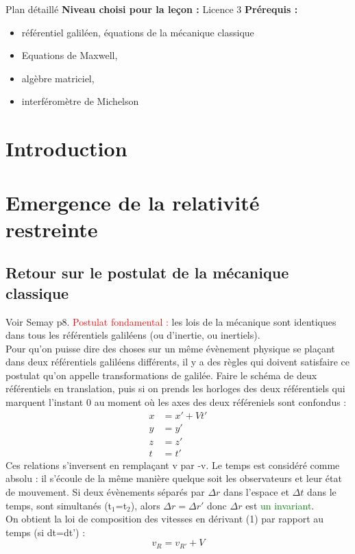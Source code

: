 \begin{reportBlock}{Plan détaillé}
  \textbf{Niveau choisi pour la leçon :} Licence 3
  \newline
  \textbf{Prérequis : }
  \begin{itemize}
      \item référentiel galiléen, équations de la mécanique classique
      \item Equations de Maxwell,
      \item algèbre matriciel,
      \item interféromètre de Michelson
  \end{itemize}

\section*{Introduction}

\section{Emergence de la relativité restreinte}

\subsection{Retour sur le postulat de la mécanique classique}
Voir Semay p8. \textcolor{red}{Postulat fondamental :} les lois de la mécanique sont identiques dans tous les référentiels galiléens (ou d'inertie, ou inertiels).\\
Pour qu'on puisse dire des choses sur un même évènement physique se plaçant dans deux référentiels galiléens différents, il y a des règles qui doivent satisfaire ce postulat qu'on appelle transformations de galilée. Faire le schéma de deux référentiels en translation, puis si on prends les horloges des deux référentiels qui marquent l'instant 0 au moment où les axes des deux référeniels sont confondus :
\begin{align}
    x &= x'+Vt' \\
    y &= y' \\
    z &= z' \\
    t &= t'
\end{align}
Ces relations s'inversent en remplaçant v par -v. Le temps est considéré comme absolu : il s'écoule de la même manière quelque soit les observateurs et leur état de mouvement. Si deux évènements séparés par $\Delta r$ dans l'espace et $\Delta t$ dans le temps, sont simultanés (t$_1$=t$_2$), alors $\Delta r =\Delta r'$ donc $\Delta r$ est \textcolor{green}{un invariant}.\\
On obtient la loi de composition des vitesses en dérivant (1) par rapport au temps (si dt=dt') :
\begin{equation}
    v_{R} = v_{R'} + V
\end{equation}


\end{reportBlock}

